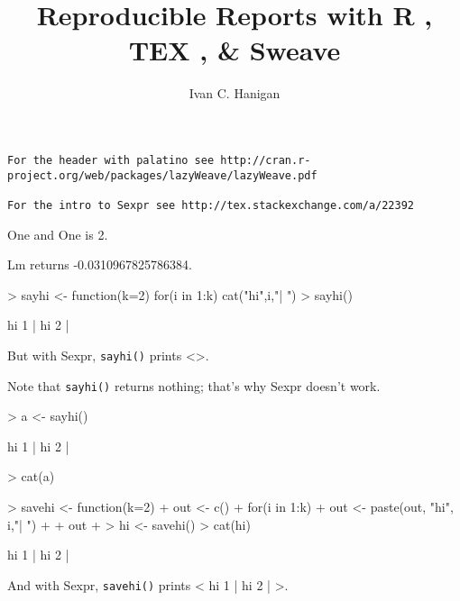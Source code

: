 \documentclass[a4paper]{report}
\begin{document}



\title{Reproducible Reports with R , TEX , \& Sweave}
\author{Ivan C. Hanigan}
\date{}
\maketitle

\begin{verbatim}
For the header with palatino see http://cran.r-project.org/web/packages/lazyWeave/lazyWeave.pdf

For the intro to Sexpr see http://tex.stackexchange.com/a/22392
\end{verbatim}

One and One is 2.

Lm returns -0.0310967825786384.

\begin{Schunk}
\begin{Sinput}
> sayhi <- function(k=2) {for(i in 1:k) cat("hi",i,"| ") }
> sayhi()
\end{Sinput}
\begin{Soutput}
hi 1 | hi 2 | 
\end{Soutput}
\end{Schunk}

But with Sexpr, {\tt sayhi()} prints <>.

Note that {\tt sayhi()} returns nothing; that's why Sexpr doesn't work.

\begin{Schunk}
\begin{Sinput}
> a <- sayhi()
\end{Sinput}
\begin{Soutput}
hi 1 | hi 2 | 
\end{Soutput}
\begin{Sinput}
> cat(a)
\end{Sinput}
\end{Schunk}

\begin{Schunk}
\begin{Sinput}
> savehi <- function(k=2) {
+   out <- c()
+   for(i in 1:k) {
+     out <- paste(out, "hi", i,"| ")
+   }
+   out
+ }
> hi <- savehi()
> cat(hi)
\end{Sinput}
\begin{Soutput}
 hi 1 |  hi 2 | 
\end{Soutput}
\end{Schunk}

And with Sexpr, {\tt savehi()} prints < hi 1 |  hi 2 | >.



\end{document}
